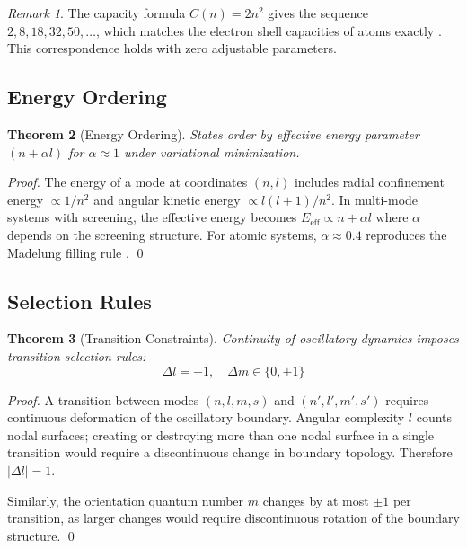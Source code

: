 \documentclass[twocolumn,10pt,a4paper]{article}
\newtheorem{theorem}{Theorem}[section]
\theoremstyle{definition}
\theoremstyle{remark}
\newtheorem{remark}[theorem]{Remark}
\begin{document}
\begin{remark}
The capacity formula $C(n) = 2n^2$ gives the sequence $2, 8, 18, 32, 50, \ldots$, which matches the electron shell capacities of atoms exactly \citep{bohr1913,pauli1925}. This correspondence holds with zero adjustable parameters.
\end{remark}

\subsection{Energy Ordering}

\begin{theorem}[Energy Ordering]
\label{thm:energy-ordering}
States order by effective energy parameter $(n + \alpha l)$ for $\alpha \approx 1$ under variational minimization.
\end{theorem}

\begin{proof}
The energy of a mode at coordinates $(n, l)$ includes radial confinement energy $\propto 1/n^2$ and angular kinetic energy $\propto l(l+1)/n^2$. In multi-mode systems with screening, the effective energy becomes $E_{\text{eff}} \propto n + \alpha l$ where $\alpha$ depends on the screening structure. For atomic systems, $\alpha \approx 0.4$ reproduces the Madelung filling rule \citep{madelung1936}. \qed
\end{proof}

\subsection{Selection Rules}

\begin{theorem}[Transition Constraints]
\label{thm:selection}
Continuity of oscillatory dynamics imposes transition selection rules:
\begin{equation}
    \Delta l = \pm 1, \quad \Delta m \in \{0, \pm 1\}
\end{equation}
\end{theorem}

\begin{proof}
A transition between modes $(n, l, m, s)$ and $(n', l', m', s')$ requires continuous deformation of the oscillatory boundary. Angular complexity $l$ counts nodal surfaces; creating or destroying more than one nodal surface in a single transition would require a discontinuous change in boundary topology. Therefore $|\Delta l| = 1$.

Similarly, the orientation quantum number $m$ changes by at most $\pm 1$ per transition, as larger changes would require discontinuous rotation of the boundary structure. \qed
\end{proof}
\end{document}
